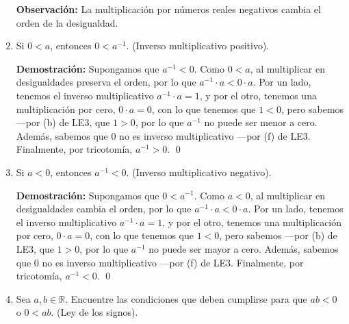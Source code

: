 \documentclass[11pt]{article}
\newcommand{\R}{\mathbb{R}}
\begin{document}
\begin{enumerate}[label=\alph*)]
    \textbf{Observación:} La multiplicación por números reales negativos cambia el orden de la desigualdad.

    \item Si $0<a$, entonces $0<a^{-1}$. (Inverso multiplicativo positivo).
    
    \textbf{Demostración:} Supongamos que $a^{-1}<0$. Como $0<a$, al multiplicar en desigualdades preserva el orden, por lo que $a^{-1} \cdot a<0 \cdot a$. Por un lado, tenemos el inverso multiplicativo $a^{-1} \cdot a = 1$, y por el otro, tenemos una multiplicación por cero, $0\cdot a=0$, con lo que tenemos que $1<0$, pero sabemos —por (b) de LE3, que $1>0$, por lo que $a^{-1}$ no puede ser menor a cero. Además, sabemos que $0$ no es inverso multiplicativo —por (f) de LE3. Finalmente, por tricotomía, $a^{-1}>0$. \qed

    \item Si $a<0$, entonces $a^{-1}<0$. (Inverso multiplicativo negativo).
    
    \textbf{Demostración:} Supongamos que $0<a^{-1}$. Como $a<0$, al multiplicar en desigualdades cambia el orden, por lo que $a^{-1} \cdot a < 0 \cdot a$. Por un lado, tenemos el inverso multiplicativo $a^{-1}\cdot a =1$, y por el otro, tenemos una multiplicación por cero, $0\cdot a =0$, con lo que tenemos que $1<0$, pero sabemos —por (b) de LE3, que $1>0$, por lo que $a^{-1}$ no puede ser mayor a cero. Además, sabemos que $0$ no es inverso multiplicativo —por (f) de LE3. Finalmente, por tricotomía, $a^{-1}<0$. \qed

    \item Sea $a,b\in \R$. Encuentre las condiciones que deben cumplirse para que $ab<0$ o $0<ab$. (Ley de los signos).
    

\end{enumerate}
\end{document}
